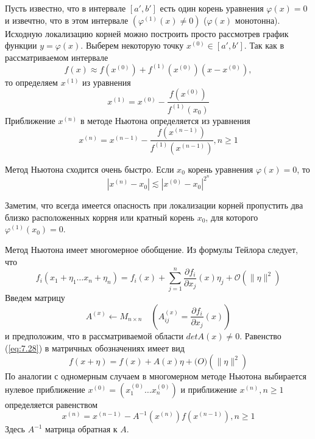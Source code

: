 Пусть известно, что в интервале $[a', b']$ есть один корень уравнения $\varphi(x) = 0$ и извечтно, что в этом интервале $(\varphi^{(1)}(x) \neq 0)$ ($\varphi(x)$ монотонна). Исходную локализацию корней можно построить просто рассмотрев график функции $y = \varphi(x)$. Выберем некоторую точку $x^{(0)} \in [a', b']$. Так как в рассматриваемом интервале 
\begin{equation} \label{eq:7.24}
	f(x) \approx f(x^{(0)}) + f^{(1)}(x^{(0)})(x-x^{(0)}),
\end{equation} 
то определяем $x^{(1)}$ из уравнения
\begin{equation} \label{eq:7.25}
	x^{(1)} = x^{(0)} - \frac{f(x^{(0)})}{f^{(1)}(x_0)}
\end{equation}
Приближение $x^{(n)}$ в методе Ньютона определяется из уравнения
\begin{equation} \label{eq:7.26}
	x^{(n)} = x^{(n-1)} - \frac{f(x^{(n-1)})}{f^{(1)}(x^{(n-1)})}, n \geq 1
\end{equation} 

Метод Ньютона сходится очень быстро. Если $x_0$ корень уравнения $\varphi(x) = 0$, то
\begin{equation} \label{eq:7.27}
	|x^{(n)} - x_0| \lesssim |x^{(0)} - x_0|^{2^n}
\end{equation} 

Заметим, что всегда имеется опасность при локализации корней пропустить два близко расположенных коррня или кратный корень $x_0$, для которого $\varphi^{(1)}(x_0) = 0$.

Метод Ньютона имеет многомерное обобщение. Из формулы Тейлора следует, что 
\begin{equation} \label{eq:7.28}
	f_i(x_1 + \eta_1 \dots x_n + \eta_n) = f_i(x) + \sum^n_{j=1}{\frac{\partial f_i}{\partial x_j}(x) \eta_j + \mathcal{O}(\|\eta\|^2)}
\end{equation} 
Введем матрицу
\begin{equation} \label{eq:7.29}
	A^{(x)} \gets M_{n \times n} \quad (A^{(x)}_{ij} = \frac{\partial f_i}{\partial x_j}(x))
\end{equation} 
и предположим, что в рассматриваемой области $detA(x) \neq 0$. Равенство (\ref{eq:7.28}) в матричных обозначениях имеет вид
\begin{equation} \label{eq:7.30}
	f(x + \eta) = f(x) + A(x)\eta + \mathcal(O)(\|\eta\|^2)
\end{equation} 
По аналогии с одномерным случаем в многомерном методе Ньютона выбирается нулевое приближение $x^{(0)} = (x^{(0)}_1 \dots x^{(0)}_n)$ и приближение $x^{(n)}, n \geq 1$ определяется равенством
\begin{equation} \label{eq:7.31}
	x^{(n)} = x^{(n-1)} - A^{-1}(x^{(n)})f(x^{(n-1)}), n \geq 1
\end{equation} 
Здесь $A^{-1}$ матрица обратная к $A$.